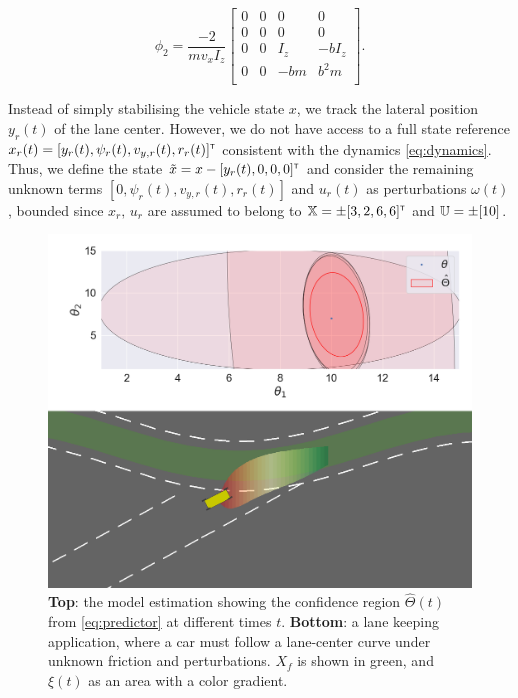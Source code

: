 \[
\phi_2 = \frac{-2}{m v_x I_z}\begin{bmatrix}
0 & 0 & 0 & 0 \\
0 & 0 & 0 & 0 \\
0 & 0 & I_z & -b I_z \\
0 & 0 & - bm & b^2 m \\
\end{bmatrix}.
\]

Instead of simply stabilising the vehicle state $x$, we track the lateral position $y_r(t)$ of the lane center. However, we do not have access to a full state reference $x_r(t) = [y_r(t), \psi_r(t), v_{y,r}(t), r_r(t)]^{\mathsf{\scriptscriptstyle T}}$ consistent with the dynamics \eqref{eq:dynamics}. Thus, we define the state $\tilde{x} = x - [y_r(t), 0, 0, 0]^{\mathsf{\scriptscriptstyle T}}$ and consider the remaining unknown terms $[0, \psi_r(t), v_{y,r}(t), r_r(t)]$ and $u_r(t)$ as perturbations $\omega(t)$, bounded since $x_r,\,u_r$ are assumed to belong to $\mathbb{X} = \pm[3, 2, 6, 6]^{\mathsf{\scriptscriptstyle T}}$ and $\mathbb{U}=\pm[10]$.

\begin{figure}[th]
	\centering
	\includegraphics[width=0.9\linewidth]{img/lane-keeping.png}
	\caption{\textbf{Top}: the model estimation showing the confidence region $\hat{\Theta}(t)$ from \eqref{eq:predictor} at different times $t$. \textbf{Bottom}: a lane keeping application, where a car must follow a lane-center curve under unknown friction and perturbations. $X_f$ is shown in green, and $\xi(t)$ as an area with a color gradient.}
	\label{fig:lane-keeping}
\end{figure}


